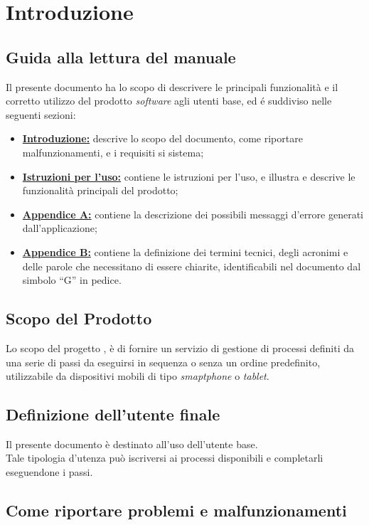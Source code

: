 \section{Introduzione}
\label{introduzione}
\subsection{Guida alla lettura del manuale}
Il presente documento ha lo scopo di descrivere le principali funzionalità e il corretto utilizzo del prodotto \textit{software} \progetto{} agli utenti base, ed é suddiviso nelle seguenti sezioni:

\begin{itemize}
\item \hyperref[introduzione]{\textbf{Introduzione:}} descrive lo scopo del documento, come riportare malfunzionamenti, e i requisiti si sistema;
\item \hyperref[istruzioni]{\textbf{Istruzioni per l'uso:}} contiene le istruzioni per l'uso, e illustra e descrive le funzionalità principali del prodotto;
\item \hyperref[errori]{\textbf{Appendice A:}} contiene la descrizione dei possibili messaggi d'errore generati dall'applicazione;
\item \hyperref[glossario]{\textbf{Appendice B:}} contiene la definizione dei termini tecnici, degli acronimi e delle parole che necessitano di essere chiarite, identificabili nel documento dal simbolo ``G'' in pedice.
\end{itemize}


\subsection{Scopo del Prodotto}
Lo scopo del progetto \progetto{}, è di fornire un servizio di gestione di processi definiti da una serie di passi da eseguirsi in sequenza o senza un ordine predefinito, utilizzabile da dispositivi mobili di tipo \textit{smaptphone} o \textit{tablet}.

\subsection{Definizione dell'utente finale}
Il presente documento è destinato all'uso dell'utente base.\\
Tale tipologia d'utenza può iscriversi ai processi disponibili e completarli eseguendone i passi.

\subsection{Come riportare problemi e malfunzionamenti}

